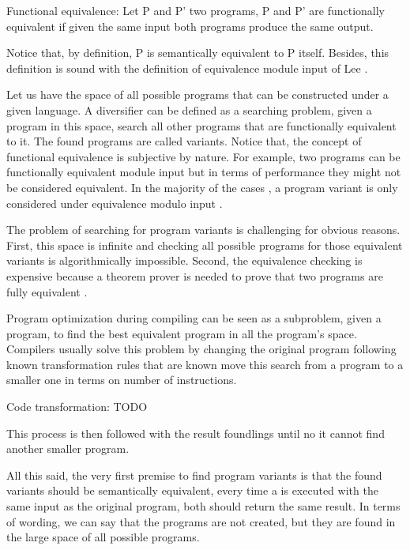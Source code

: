
\begin{definition}{Functional equivalence:}
    \label{def:semantic_equivalence}
    Let P and P' two programs, P and P' are functionally equivalent if given the same input both programs produce the same output.
    
    Notice that, by definition, P is semantically equivalent to P itself. Besides, this definition is sound with the definition of equivalence module input of Lee \etal \cite{}.
\end{definition}

Let us have the space of all possible programs that can be constructed under a given language. A diversifier can be defined as a searching problem, \ie given a program in this space, search all other programs that are functionally equivalent to it. The found programs are called variants. Notice that, the concept of functional equivalence is subjective by nature. For example, two programs can be functionally equivalent module input but in terms of performance they might not be considered equivalent. In the majority of the cases \cite{}, a program variant is only considered under equivalence modulo input \cite{}.

The problem of searching for program variants is challenging for obvious reasons. First, this space is infinite and checking all possible programs for those equivalent variants is algorithmically impossible. Second, the equivalence checking is expensive because a theorem prover is needed to prove that two programs are fully equivalent \cite{}.

Program optimization during compiling can be seen as a subproblem, \ie given a program, to find the best equivalent program in all the program's space. Compilers usually solve this problem by changing the original program following known transformation rules that are known move this search from a program to a smaller one in terms on number of instructions. 


\begin{definition}{Code transformation:}
    \label{def:code_transformation}
    TODO
\end{definition}

This process is then followed with the result foundlings until no it cannot find another smaller program. 


All this said, the very first premise to find program variants is that the found variants should be semantically equivalent, \ie every time a is executed with the same input as the original program, both should return the same result. In terms of wording, we can say that the programs are not created, but they are found in the large space of all possible programs. 


